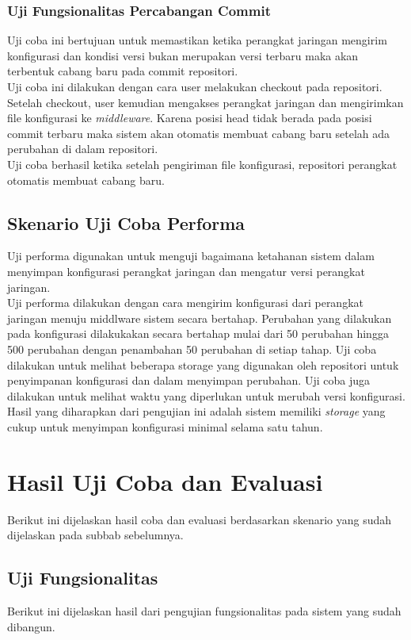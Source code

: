     	\subsubsection{Uji Fungsionalitas Percabangan Commit}
    	Uji coba ini bertujuan untuk memastikan ketika perangkat jaringan mengirim konfigurasi dan kondisi versi bukan merupakan versi terbaru maka akan terbentuk cabang baru pada commit repositori.\\
    	\indent Uji coba ini dilakukan dengan cara user melakukan checkout pada repositori. Setelah checkout, user kemudian mengakses perangkat jaringan dan mengirimkan file konfigurasi ke \textit{middleware}. Karena posisi head tidak berada pada posisi commit terbaru maka sistem akan otomatis membuat cabang baru setelah ada perubahan di dalam repositori.\\
    	\indent Uji coba berhasil ketika setelah pengiriman file konfigurasi, repositori perangkat otomatis membuat cabang baru.
    	 
    \subsection{Skenario Uji Coba Performa}
    	Uji performa digunakan untuk menguji bagaimana ketahanan sistem dalam menyimpan konfigurasi perangkat jaringan dan mengatur versi perangkat jaringan.\\
    	\indent Uji performa dilakukan dengan cara mengirim konfigurasi dari perangkat jaringan menuju middlware sistem secara bertahap. Perubahan yang dilakukan pada konfigurasi dilakukakan secara bertahap mulai dari 50 perubahan hingga 500 perubahan dengan penambahan 50 perubahan di setiap tahap. Uji coba dilakukan untuk melihat beberapa storage yang digunakan oleh repositori untuk penyimpanan konfigurasi dan dalam menyimpan perubahan. Uji coba juga dilakukan untuk melihat waktu yang diperlukan untuk merubah versi konfigurasi.\\ 
    	\indent Hasil yang diharapkan dari pengujian ini adalah sistem memiliki \textit{storage} yang cukup untuk menyimpan konfigurasi minimal selama satu tahun. 
    
\section{Hasil Uji Coba dan Evaluasi}
	Berikut ini dijelaskan hasil coba dan evaluasi berdasarkan skenario yang sudah dijelaskan pada subbab sebelumnya.
	
	\subsection{Uji Fungsionalitas}
	Berikut ini dijelaskan hasil dari pengujian fungsionalitas pada sistem yang sudah dibangun.
	
